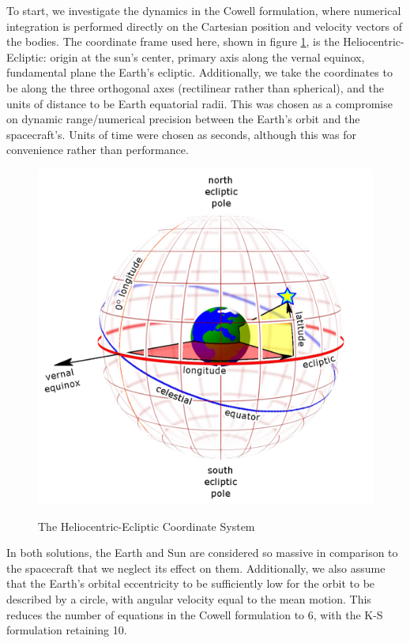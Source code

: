 \documentclass[11pt,twoside,letterpaper]{article}
\begin{document}
  To start, we investigate the dynamics in the Cowell formulation,
  where numerical integration is performed directly on the Cartesian
  position and velocity vectors of the bodies. The coordinate frame
  used here, shown in figure \ref{coords}, is the
  Heliocentric-Ecliptic: origin at the sun’s center, primary axis
  along the vernal equinox, fundamental plane the Earth’s
  ecliptic. Additionally, we take the coordinates to be along the
  three orthogonal axes (rectilinear rather than spherical), and the
  units of distance to be Earth equatorial radii. This was chosen as a
  compromise on dynamic range/numerical precision between the Earth’s
  orbit and the spacecraft’s. Units of time were chosen as seconds,
  although this was for convenience rather than performance.

  \begin{figure}
    \caption{The Heliocentric-Ecliptic Coordinate System}
    \centering
    \includegraphics[scale=0.15]{HeliocentricEcliptic}
    \label{coords}
  \end{figure}
  
  In both solutions, the Earth and Sun are considered so massive in
  comparison to the spacecraft that we neglect its effect on
  them. Additionally, we also assume that the Earth's orbital
  eccentricity to be sufficiently low for the orbit to be described by
  a circle, with angular velocity equal to the mean motion. This
  reduces the number of equations in the Cowell formulation to 6, with
  the K-S formulation retaining 10.
\end{document}

